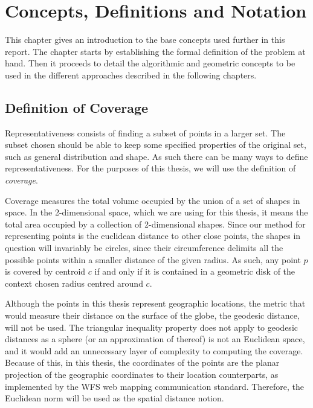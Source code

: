 \cleardoublepage  
\chapter{Concepts, Definitions and Notation}
\label{chap:theory}
This chapter gives an introduction to the base concepts used further in this report.
The chapter starts by establishing the formal definition of the problem at hand. 
Then it proceeds to detail the algorithmic and geometric concepts to be used in the different approaches described in the following chapters.
\section{Definition of Coverage}
\label{sect:problem}
Representativeness consists of finding a subset of points in a larger set. The subset chosen should be able to keep some specified properties of the original set, such as general distribution and shape. As such there can be many ways to define representativeness. For the purposes of this thesis, we will use the definition of \emph{coverage}.

Coverage measures the total volume occupied by the union of a set of shapes in space. In the 2-dimensional space, which we are using for this thesis, it means the total area occupied by a collection of 2-dimensional shapes. Since our method for representing points is the euclidean distance to other close points, the shapes in question will invariably be circles, since their circumference delimits all the possible points within a smaller distance of the given radius. As such, any point $p$ is covered by centroid $c$ if and only if it is contained in a geometric disk of the context chosen radius centred around $c$.

Although the points in this thesis represent geographic locations, the metric that would measure their distance on the surface of the globe, the geodesic distance, will not be used. The triangular inequality property does not apply to geodesic distances as a sphere (or an approximation of thereof) is not an Euclidean space, and it would add an unnecessary layer of complexity to computing the coverage.
Because of this, in this thesis, the coordinates of the points are the planar projection of the geographic coordinates to their location counterparts, as implemented by the WFS web mapping communication standard. Therefore, the Euclidean norm will be used as the spatial distance notion.

